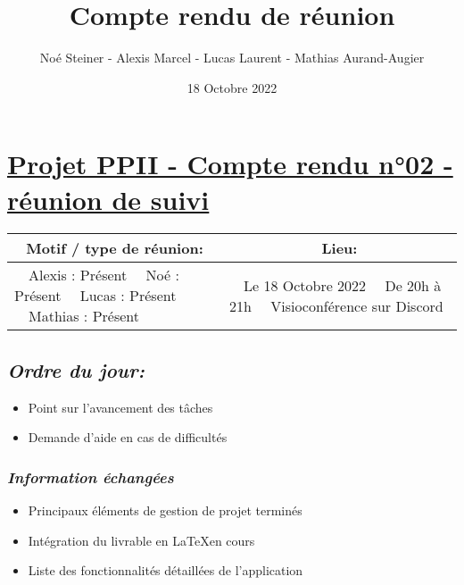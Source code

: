 \documentclass[french,a4paper]{article}
\author{Noé Steiner - Alexis Marcel - Lucas Laurent - Mathias Aurand-Augier}
\date{18 Octobre 2022}
\newcommand{\tabitem}{\textbullet~~}\title{Compte rendu de réunion}
\begin{document}
\maketitle

\section*{\underline{Projet PPII - Compte rendu n°02 - réunion de suivi}}

\begin{table}[!htb]
  \centering
  \begin{tabular}{| p{7cm} | p{7cm} |}
    \hline
    \multicolumn{1}{|c|}{ Motif / type de réunion:} & \multicolumn{1}{c|}{Lieu:} \\
    \hline
    \tabitem Alexis : Présent\newline
    \tabitem Noé : Présent\newline
    \tabitem Lucas : Présent\newline
    \tabitem Mathias : Présent                      &
    \tabitem Le 18 Octobre 2022\newline
    \tabitem De 20h à 21h\newline
    \tabitem Visioconférence sur Discord                                                                   \\
    \hline
  \end{tabular}
\end{table}

\subsection*{\textit{Ordre du jour:}}

\begin{itemize}
  \item Point sur l'avancement des tâches
  \item Demande d'aide en cas de difficultés
\end{itemize}

\subsubsection*{\textit{Information échangées}}
\begin{itemize}
  \item Principaux éléments de gestion de projet terminés
  \item Intégration du livrable en \LaTeX \space en cours
  \item Liste des fonctionnalités détaillées de l'application 
\end{itemize}
\end{document}
